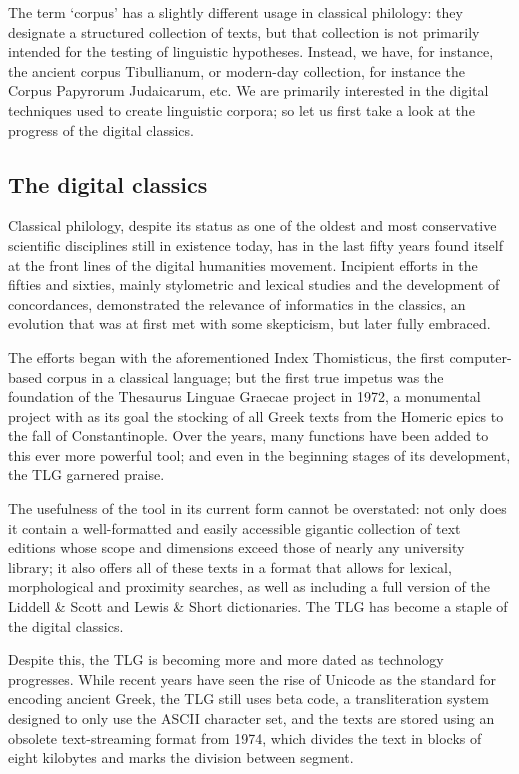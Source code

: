 The term `corpus' has a slightly different usage in classical philology: they
designate a structured collection of texts, but that collection is not
primarily intended for the testing of linguistic hypotheses. Instead, we have,
for instance, the ancient corpus Tibullianum, or modern-day collection, for
  instance the Corpus Papyrorum Judaicarum, etc. We are primarily interested in
  the digital techniques used to create linguistic corpora; so let us first
  take a look at the progress of the digital classics.


\subsection{The digital classics} 

Classical philology, despite its status as one of the oldest and most
conservative scientific disciplines still in existence today, has in the last
fifty years found itself at the front lines of the digital humanities movement.
Incipient efforts in the fifties and sixties, mainly stylometric and lexical
studies and  the development of concordances, demonstrated the relevance of
informatics in the classics, an evolution that was at first met with some
skepticism, but later fully embraced.

The efforts began with the aforementioned Index Thomisticus, the first
computer-based corpus in a classical language; but the first true impetus was
the foundation of the Thesaurus Linguae Graecae project in 1972, a monumental
project with as its goal the stocking of all Greek texts from the Homeric epics
to the fall of Constantinople. Over the years, many functions have been added
to this ever more powerful tool; and even in the beginning stages of its
development, the TLG garnered praise.

The usefulness of the tool in its current form cannot be overstated: not only
does it contain a well-formatted and easily accessible gigantic collection of
text editions whose scope and dimensions exceed those of nearly any university
library; it also offers all of these texts in a format that allows for lexical,
morphological and proximity searches, as well as including a full version of
the Liddell \& Scott and Lewis \& Short dictionaries. The TLG has become a
staple of the digital classics.

Despite this, the TLG is becoming more and more dated as technology progresses.
While recent years have seen the rise of Unicode as the standard for encoding
ancient Greek, the TLG still uses beta code, a transliteration system designed
to only use the ASCII character set, and the texts are stored using an obsolete
text-streaming format from 1974, which divides the text in blocks of eight
kilobytes and marks the division between segment. 

